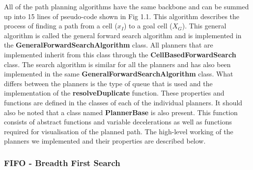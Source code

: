 \documentclass[a4paper,12pt]{article}
\begin{document}
			All of the path planning algorithms have the same backbone and can be summed up into 15 lines of pseudo-code shown in Fig 1.1. This algorithm describes the process of finding a path from a cell ($x_I$) to a goal cell ($X_G$). This general algorithm is called the general forward search algorithm and is implemented in the \textbf{GeneralForwardSearchAlgorithm} class. All planners that are implemented inherit from this class through the \textbf{CellBasedForwardSearch} class. The search algorithm is similar for all the planners and has also been implemented in the same \textbf{GeneralForwardSearchAlgorithm} class. What differs between the planners is the type of queue that is used and the implementation of the \textbf{resolveDuplicate} function. These properties and functions are defined in the classes of each of the individual planners. It should also be noted that a class named \textbf{PlannerBase} is also present. This function consists of abstract functions and variable decelerations as well as functions required for visualisation of the planned path. The high-level working of the planners we implemented and their properties are described below.
			
			\subsubsection{FIFO - Breadth First Search}
\end{document}
